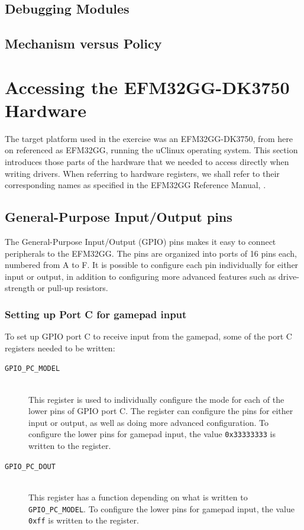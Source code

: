 \subsection{Debugging Modules}


\subsection{Mechanism versus Policy}



\section{Accessing the EFM32GG-DK3750 Hardware}
The target platform used in the exercise was an EFM32GG-DK3750, from here on referenced as EFM32GG, running the uClinux operating system. This section introduces those parts of the hardware that we needed to access directly when writing drivers. When referring to hardware registers, we shall refer to their corresponding names as specified in the EFM32GG Reference Manual, \cite{efm32gg-rm}.


\subsection{General-Purpose Input/Output pins}\label{sec:gpio}
The General-Purpose Input/Output (GPIO) pins makes it easy to connect peripherals to the EFM32GG. The pins are organized into ports of 16 pins each, numbered from A to F. It is possible to configure each pin individually for either input or output, in addition to configuring more advanced features such as drive-strength or pull-up resistors.

\subsubsection{Setting up Port C for gamepad input}\label{sec:gpio-access}
To set up GPIO port C to receive input from the gamepad, some of the port C registers needed to be written:
\begin{description}
  \item[\texttt{GPIO\_PC\_MODEL}] \hfill \\
    This register is used to individually configure the mode for each of the lower pins of GPIO port C. The register can configure the pins for either input or output, as well as doing more advanced configuration. To configure the lower pins for gamepad input, the value \texttt{0x33333333} is written to the register.
  \item[\texttt{GPIO\_PC\_DOUT}] \hfill \\ 
    This register has a function depending on what is written to \texttt{GPIO\_PC\_MODEL}. To configure the lower pins for gamepad input, the value \texttt{0xff} is written to the register.
\end{description}

